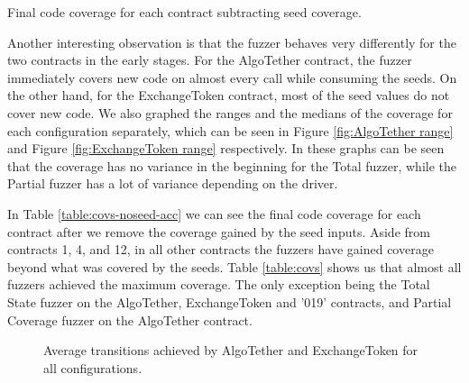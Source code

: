 \begin{table}[hbp]
    \centering
    \caption{Final code coverage for each contract subtracting seed coverage.}\label{table:covs-noseed-acc}
\end{table}

Another interesting observation is that the fuzzer behaves very differently for the two contracts in the early stages.
For the AlgoTether contract, the fuzzer immediately covers new code on almost every call while consuming the seeds.
On the other hand, for the ExchangeToken contract, most of the seed values do not cover new code.
We also graphed the ranges and the medians of the coverage for each configuration separately, which can be seen in Figure \ref{fig:AlgoTether range} and Figure \ref{fig:ExchangeToken range} respectively.
In these graphs can be seen that the coverage has no variance in the beginning for the Total fuzzer, while the Partial fuzzer has a lot of variance depending on the driver.

In Table \ref{table:covs-noseed-acc} we can see the final code coverage for each contract after we remove the coverage gained by the seed inputs.
Aside from contracts 1, 4, and 12, in all other contracts the fuzzers have gained coverage beyond what was covered by the seeds.
Table \ref{table:covs} shows us that almost all fuzzers achieved the maximum coverage.
The only exception being the Total State fuzzer on the AlgoTether, ExchangeToken and '019' contracts, and Partial Coverage fuzzer on the AlgoTether contract.



\begin{figure}[!b]
    \centering
    \hfill
    \caption{Average transitions achieved by AlgoTether and ExchangeToken for all configurations.}
    \label{fig:unique_transitions}
\end{figure}

